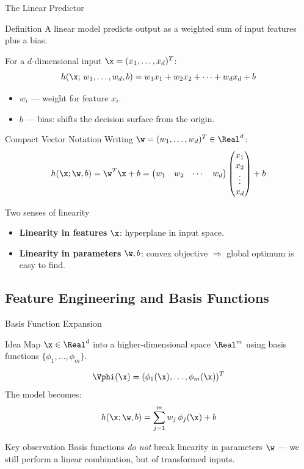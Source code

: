 \begin{frame}{The Linear Predictor}
  \begin{block}{Definition}
    A \alert{linear model} predicts output as a weighted sum of input features plus a bias.
  \end{block}
  \vspace{.3em}
  For a $d$-dimensional input $\x = (x_1,\ldots,x_d)^T$:
  \[
    h(\x;\,w_1,\ldots,w_d,b) = w_1 x_1 + w_2 x_2 + \cdots + w_d x_d + b
  \]
  \begin{itemize}
    \item $w_i$ — weight for feature $x_i$.
    \item $b$ — \alert{bias}: shifts the decision surface from the origin.
  \end{itemize}
\end{frame}

\begin{frame}{Compact Vector Notation}
  Writing $\w = (w_1,\ldots,w_d)^T \in \Real^d$:
  \[
    h(\x;\w,b) = \w^T\x + b =
    \begin{pmatrix}w_1&w_2&\cdots&w_d\end{pmatrix}
    \begin{pmatrix}x_1\\x_2\\\vdots\\x_d\end{pmatrix} + b
  \]
  \vspace{.3em}
  \begin{alertblock}{Two senses of linearity}
    \begin{itemize}
      \item \textbf{Linearity in features} $\x$: hyperplane in input space.
      \item \textbf{Linearity in parameters} $\w, b$: convex objective $\Rightarrow$ global optimum is easy to find.
    \end{itemize}
  \end{alertblock}
\end{frame}

\subsection{Feature Engineering and Basis Functions}

\begin{frame}{Basis Function Expansion}
  \begin{block}{Idea}
    Map $\x\in\Real^d$ into a higher-dimensional space $\Real^m$ using \alert{basis functions}
    $\{\phi_1,\ldots,\phi_m\}$.
  \end{block}
  \[
    \Vphi(\x) = (\phi_1(\x),\ldots,\phi_m(\x))^T
  \]
  The model becomes:
  \[
    h(\x;\w,b) = \sum_{j=1}^m w_j\,\phi_j(\x) + b
  \]
  \begin{exampleblock}{Key observation}
    Basis functions \emph{do not} break linearity in parameters $\w$ —
    we still perform a linear combination, but of transformed inputs.
  \end{exampleblock}
\end{frame}

